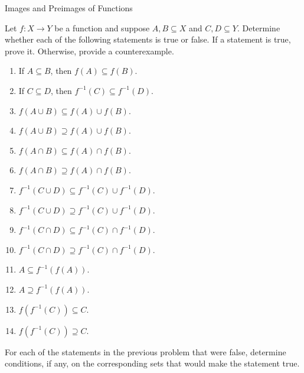 \begin{section}{Images and Preimages of Functions}
\begin{problem}
Let $f:X\to Y$ be a function and suppose $A, B\subseteq X$ and $C, D\subseteq Y$. Determine whether each of the following statements is true or false. If a statement is true, prove it.  Otherwise, provide a counterexample.
\begin{enumerate}[label=\textrm{(\alph*)}]
\item If $A\subseteq B$, then $f(A)\subseteq f(B)$.
\item If $C\subseteq D$, then $f^{-1}(C)\subseteq f^{-1}(D)$.
\item $f(A\cup B)\subseteq f(A)\cup f(B)$.
\item $f(A\cup B)\supseteq f(A)\cup f(B)$.
\item $f(A\cap B)\subseteq f(A)\cap f(B)$.
\item $f(A\cap B)\supseteq f(A)\cap f(B)$.
\item $f^{-1}(C\cup D)\subseteq f^{-1}(C)\cup f^{-1}(D)$.
\item $f^{-1}(C\cup D)\supseteq f^{-1}(C)\cup f^{-1}(D)$.
\item $f^{-1}(C\cap D)\subseteq f^{-1}(C)\cap f^{-1}(D)$.
\item $f^{-1}(C\cap D)\supseteq f^{-1}(C)\cap f^{-1}(D)$.
\item $A\subseteq f^{-1}(f(A))$.
\item $A\supseteq f^{-1}(f(A))$.
\item $f(f^{-1}(C))\subseteq C$.
\item $f(f^{-1}(C))\supseteq C$.
\end{enumerate}
\end{problem}

\begin{problem}
For each of the statements in the previous problem that were false, determine conditions, if any, on the corresponding sets that would make the statement true.
\end{problem}

\end{section}
